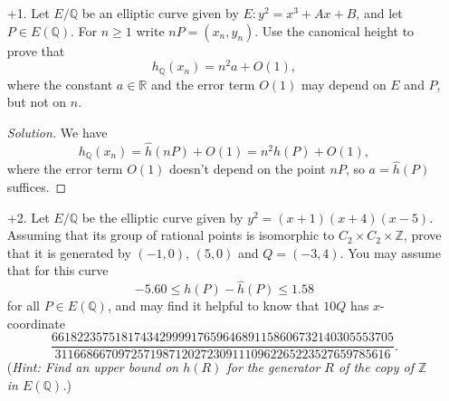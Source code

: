\documentclass[a4paper]{article}
\theoremstyle{definition}
\newcommand{\Z}{\mathbb{Z}}
\newcommand{\Q}{\mathbb{Q}}
\newcommand{\R}{\mathbb{R}}
\begin{document}
\begin{enumerate}
    \item[+1.] Let $E/\Q$ be an elliptic curve given by $E:y^2=x^3+Ax+B$, and
        let $P\in E(\Q)$. For $n\ge1$ write $nP=(x_n,y_n)$. Use the canonical
        height to prove that
        \begin{equation*}
            h_\Q(x_n) = n^2a+O(1),
        \end{equation*}
        where the constant $a\in\R$ and the error term $O(1)$ may depend on $E$
        and $P$, but not on $n$.

        \begin{proof}[Solution]
            We have
            \begin{equation*}
                h_\Q(x_n)
                    = \hat h(nP) + O(1)
                    = n^2\hat h(P) + O(1),
            \end{equation*}
            where the error term $O(1)$ doesn't depend on the point $nP$, so
            $a=\hat h(P)$ suffices.
        \end{proof}

    \item[+2.] Let $E/\Q$ be the elliptic curve given by $y^2=(x+1)(x+4)(x-5)$.
        Assuming that its group of rational points is isomorphic to
        $C_2\times C_2\times\Z$, prove that it is generated by $(-1,0)$, $(5,0)$
        and $Q=(-3,4)$. You may assume that for this curve
        \begin{equation*}
            -5.60 \le h(P) - \hat h(P) \le 1.58
        \end{equation*}
        for all $P\in E(\Q)$, and may find it helpful to know that $10Q$ has
        $x$-coordinate
        \begin{equation*}
            \frac{661822357518174342999917659646891158606732140305553705}
                {31166866709725719871202723091110962265223527659785616}.
        \end{equation*}
        (\textit{Hint: Find an upper bound on $h(R)$ for the generator $R$ of
        the copy of $\Z$ in $E(\Q)$.})


\end{enumerate}
\end{document}
